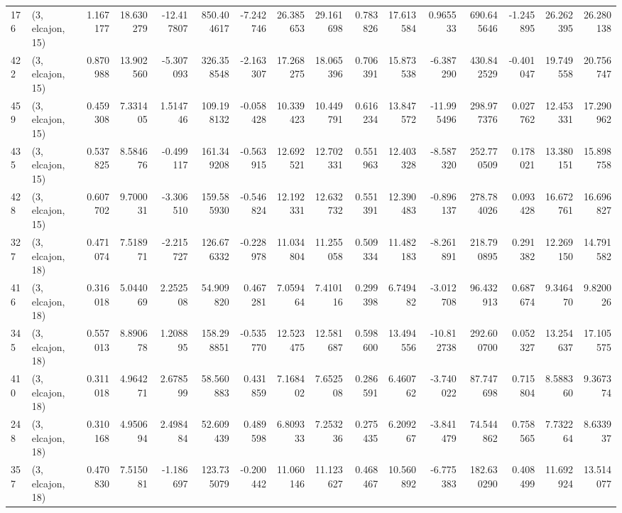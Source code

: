 \begin{tabular}{llrrrrrrrrrrrrrr}
176 &  (3, elcajon, 15) &   1.167177 &  18.630279 & -12.417807 &   850.404617 &  -7.242746 &  26.385653 &  29.161698 &  0.783826 &  17.613584 &   0.965533 &   690.645646 & -1.245895 &  26.262395 &  26.280138 \\
422 &  (3, elcajon, 15) &   0.870988 &  13.902560 &  -5.307093 &   326.358548 &  -2.163307 &  17.268275 &  18.065396 &  0.706391 &  15.873538 &  -6.387290 &   430.842529 & -0.401047 &  19.749558 &  20.756747 \\
459 &  (3, elcajon, 15) &   0.459308 &   7.331405 &   1.514746 &   109.198132 &  -0.058428 &  10.339423 &  10.449791 &  0.616234 &  13.847572 & -11.995496 &   298.977376 &  0.027762 &  12.453331 &  17.290962 \\
435 &  (3, elcajon, 15) &   0.537825 &   8.584676 &  -0.499117 &   161.349208 &  -0.563915 &  12.692521 &  12.702331 &  0.551963 &  12.403328 &  -8.587320 &   252.770509 &  0.178021 &  13.380151 &  15.898758 \\
428 &  (3, elcajon, 15) &   0.607702 &   9.700031 &  -3.306510 &   159.585930 &  -0.546824 &  12.192331 &  12.632732 &  0.551391 &  12.390483 &  -0.896137 &   278.784026 &  0.093428 &  16.672761 &  16.696827 \\
327 &  (3, elcajon, 18) &   0.471074 &   7.518971 &  -2.215727 &   126.676332 &  -0.228978 &  11.034804 &  11.255058 &  0.509334 &  11.482183 &  -8.261891 &   218.790895 &  0.291382 &  12.269150 &  14.791582 \\
416 &  (3, elcajon, 18) &   0.316018 &   5.044069 &   2.252508 &    54.909820 &   0.467281 &   7.059464 &   7.410116 &  0.299398 &   6.749482 &  -3.012708 &    96.432913 &  0.687674 &   9.346470 &   9.820026 \\
345 &  (3, elcajon, 18) &   0.557013 &   8.890678 &   1.208895 &   158.298851 &  -0.535770 &  12.523475 &  12.581687 &  0.598600 &  13.494556 & -10.812738 &   292.600700 &  0.052327 &  13.254637 &  17.105575 \\
410 &  (3, elcajon, 18) &   0.311018 &   4.964271 &   2.678599 &    58.560883 &   0.431859 &   7.168402 &   7.652508 &  0.286591 &   6.460762 &  -3.740022 &    87.747698 &  0.715804 &   8.588360 &   9.367374 \\
248 &  (3, elcajon, 18) &   0.310168 &   4.950694 &   2.498484 &    52.609439 &   0.489598 &   6.809333 &   7.253236 &  0.275435 &   6.209267 &  -3.841479 &    74.544862 &  0.758565 &   7.732264 &   8.633937 \\
357 &  (3, elcajon, 18) &   0.470830 &   7.515081 &  -1.186697 &   123.735079 &  -0.200442 &  11.060146 &  11.123627 &  0.468467 &  10.560892 &  -6.775383 &   182.630290 &  0.408499 &  11.692924 &  13.514077 \\

\end{tabular}
